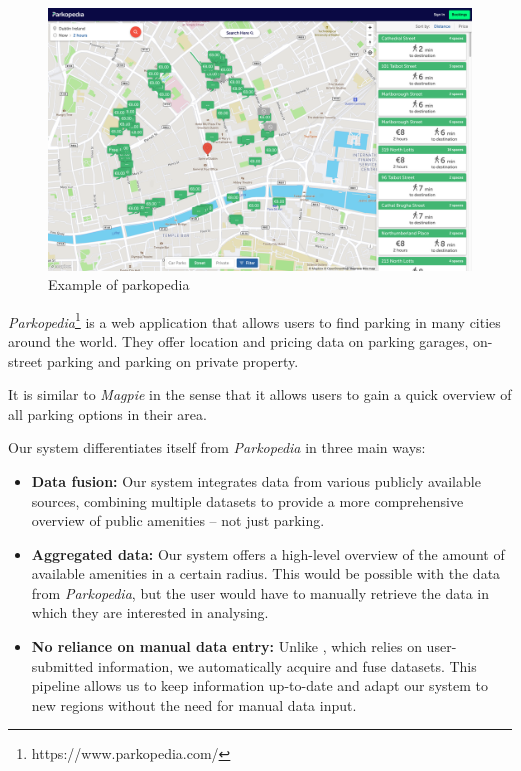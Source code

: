 \begin{figure}[h]
  \centering
  \includegraphics[width=\columnwidth]{images/parkopedia.png}
  \caption{Example of parkopedia}
  \label{fig:parkopedia}
\end{figure}

\noindent{}\textit{Parkopedia}\footnote{https://www.parkopedia.com/} is a web
application that allows users to find parking in many cities around the world.
They offer location and pricing data on parking garages, on-street parking and
parking on private property.

\noindent{}It is similar to \textit{Magpie} in the sense that it allows users to
gain a quick overview of all parking options in their area.

\noindent{}Our system differentiates itself from \textit{Parkopedia} in three
main ways:
\vspace{-3mm}
\begin{itemize}
  \item{\textbf{Data fusion:} Our system integrates data from various publicly
  available sources, combining multiple datasets to provide a more comprehensive
  overview of public amenities -- not just parking.}
  \vspace{1.25mm}

  \item{\textbf{Aggregated data:} Our system offers a high-level overview of the
  amount of available amenities in a certain radius. This would be possible with
  the data from \textit{Parkopedia}, but the user would have to manually
  retrieve the data in which they are interested in analysing.}
  \vspace{1.25mm}

  \pagebreak{}

  \item{\textbf{No reliance on manual data entry:} Unlike
  , which relies on user-submitted information, we
  automatically acquire and fuse datasets. This pipeline allows us to keep
  information up-to-date and adapt our system to new regions without the need
  for manual data input.}
  \vspace{1.25mm}

\end{itemize}

